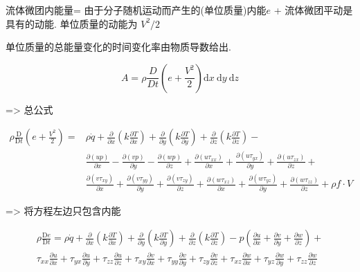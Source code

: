 \documentclass[UTF8]{ctexart}
\begin{document}
流体微团内能量= 由于分子随机运动而产生的(单位质量)内能$e$ + 流体微团平动是具有的动能. 单位质量的动能为 $V^2 / 2$

单位质量的总能量变化的时间变化率由物质导数给出.

$$
	A=\rho \frac{D}{D t}\left(e+\frac{V^{2}}{2}\right) \mathrm{d} x \mathrm{~d} y \mathrm{~d} z
$$

=> 总公式

$$
	\begin{aligned}
		\rho \frac{\mathrm{D}}{\mathrm{D} t}\left(e+\frac{V^{2}}{2}\right)= & \rho \dot{q}+\frac{\partial}{\partial x}\left(k \frac{\partial T}{\partial x}\right)+\frac{\partial}{\partial y}\left(k \frac{\partial T}{\partial y}\right)+\frac{\partial}{\partial z}\left(k \frac{\partial T}{\partial z}\right)-                                                                                                        \\
		                                                                    & \frac{\partial(u p)}{\partial x}-\frac{\partial(v p)}{\partial y}-\frac{\partial(w p)}{\partial z}+\frac{\partial\left(u \tau_{x x}\right)}{\partial x}+\frac{\partial\left(u \tau_{y x}\right)}{\partial y}+\frac{\partial\left(u \tau_{z x}\right)}{\partial z}+                                                                           \\
		                                                                    & \frac{\partial\left(v \tau_{x y}\right)}{\partial x}+\frac{\partial\left(v \tau_{y y}\right)}{\partial y}+\frac{\partial\left(v \tau_{z y}\right)}{\partial z}+\frac{\partial\left(w \tau_{x z}\right)}{\partial x}+\frac{\partial\left(w \tau_{y z}\right)}{\partial y}+\frac{\partial\left(w \tau_{z z}\right)}{\partial z}+\rho f \cdot V
	\end{aligned}
$$

=> 将方程左边只包含内能

$$
	\begin{gathered}
		\rho \frac{\mathrm{D} e}{\mathrm{D} t}=\rho \dot{q}+\frac{\partial}{\partial x}\left(k \frac{\partial T}{\partial x}\right)+\frac{\partial}{\partial y}\left(k \frac{\partial T}{\partial y}\right)+\frac{\partial}{\partial z}\left(k \frac{\partial T}{\partial z}\right)-p\left(\frac{\partial u}{\partial x}+\frac{\partial v}{\partial y}+\frac{\partial w}{\partial z}\right)+ \\
		\tau_{x x} \frac{\partial u}{\partial x}+\tau_{y x} \frac{\partial u}{\partial y}+\tau_{z z} \frac{\partial u}{\partial z}+\tau_{x y} \frac{\partial v}{\partial x}+\tau_{y y} \frac{\partial v}{\partial y}+\tau_{z y} \frac{\partial v}{\partial z}+\tau_{x z} \frac{\partial w}{\partial x}+\tau_{y z} \frac{\partial w}{\partial y}+\tau_{z z} \frac{\partial w}{\partial z}
	\end{gathered}
$$
\end{document}
